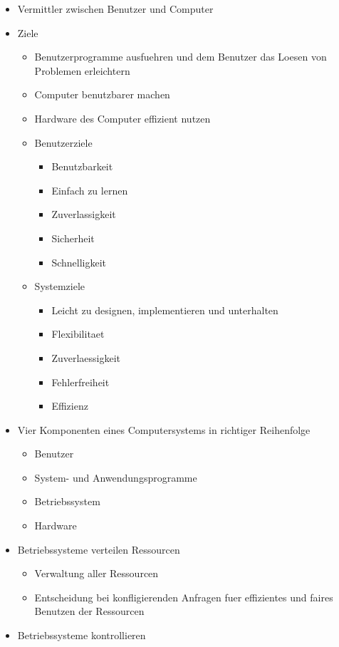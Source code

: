 \documentclass[a4paper]{scrreprt}
\begin{document}
\begin{itemize}
	\item Vermittler zwischen Benutzer und Computer
	\item Ziele
		\begin{itemize}
			\item Benutzerprogramme ausfuehren und dem Benutzer das Loesen von Problemen erleichtern
			\item Computer benutzbarer machen
			\item Hardware des Computer effizient nutzen
			\item Benutzerziele
				\begin{itemize}
					\item Benutzbarkeit
					\item Einfach zu lernen
					\item Zuverlassigkeit
					\item Sicherheit
					\item Schnelligkeit
				\end{itemize}
			\item Systemziele
				\begin{itemize}
					\item Leicht zu designen, implementieren und unterhalten
					\item Flexibilitaet
					\item Zuverlaessigkeit
					\item Fehlerfreiheit
					\item Effizienz
				\end{itemize}
		\end{itemize}
	\item Vier Komponenten eines Computersystems in richtiger Reihenfolge
		\begin{itemize}
			\item Benutzer
			\item System- und Anwendungsprogramme
			\item Betriebssystem
			\item Hardware
		\end{itemize}
	\item Betriebssysteme verteilen Ressourcen
		\begin{itemize}
			\item Verwaltung aller Ressourcen
			\item Entscheidung bei konfligierenden Anfragen fuer effizientes und faires Benutzen der Ressourcen
		\end{itemize}
	\item Betriebssysteme kontrollieren

\end{itemize}
\end{document}
